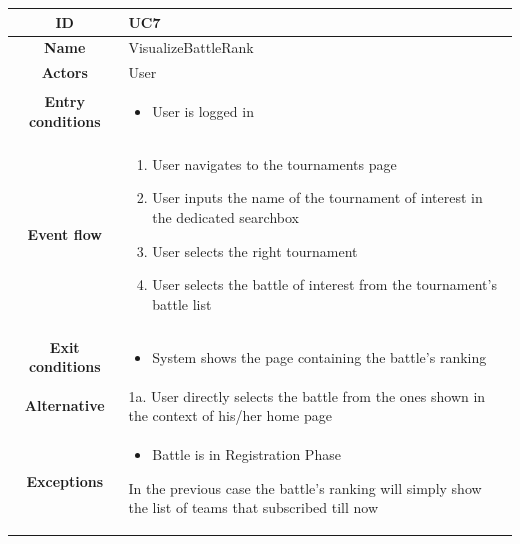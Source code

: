 \begin{center}
    \begin{tabular}{ |c|m{10cm}| }
        \hline
        \textbf{ID} & UC7 \\
        \hline
        \textbf{Name} & VisualizeBattleRank \\
        \hline
        \textbf{Actors} & User \\
        \hline
        \textbf{Entry conditions} &
        \begin{itemize}
            \item User is logged in
        \end{itemize} \\
        \hline
        \textbf{Event flow} &
        \begin{enumerate}
            \item User navigates to the tournaments page
            \item User inputs the name of the tournament of interest in the dedicated searchbox
            \item User selects the right tournament
            \item User selects the battle of interest from the tournament’s battle list
        \end{enumerate} \\
        \hline
        \textbf{Exit conditions} &
        \begin{itemize}
            \item System shows the page containing the battle’s ranking
        \end{itemize} \\
        \hline
        \textbf{Alternative} & 
            1a. User directly selects the battle from the ones shown in the context of his/her home page \\
        \hline
        \textbf{Exceptions} & 
        \begin{itemize}
            \item Battle is in Registration Phase
        \end{itemize} 
        In the previous case the battle's ranking will simply show the list of teams that subscribed till now \\
        \hline
    \end{tabular}
    \begin{figure}[H]
        \hspace{90px}

\end{figure}
\end{center}
